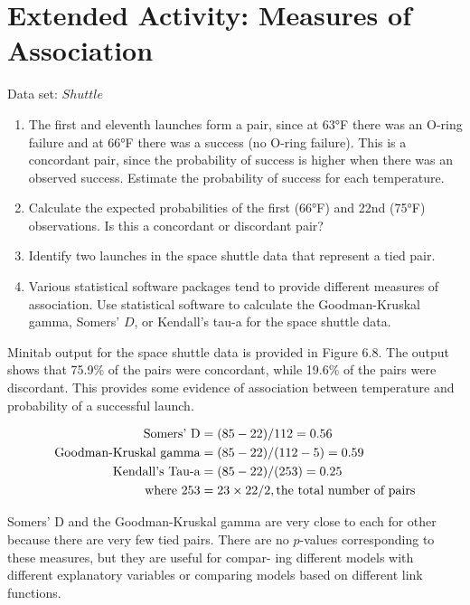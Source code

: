 \documentclass[
]{report}
\providecommand{\tightlist}{%
  \setlength{\itemsep}{0pt}\setlength{\parskip}{0pt}}
\begin{document}
\hypertarget{extended-activity-measures-of-association}{%
\section*{Extended Activity: Measures of Association}\label{extended-activity-measures-of-association}}

Data set: \(Shuttle\)

\begin{enumerate}
\def\labelenumi{\arabic{enumi}.}
\setcounter{enumi}{18}
\tightlist
\item
  The first and eleventh launches form a pair, since at 63°F there was an O-ring failure and at 66°F there was a success (no O-ring failure). This is a concordant pair, since the probability of success is higher when there was an observed success. Estimate the probability of success for each temperature.
\item
  Calculate the expected probabilities of the first (66°F) and 22nd (75°F) observations. Is this a concordant or discordant pair?
\item
  Identify two launches in the space shuttle data that represent a tied pair.
\item
  Various statistical software packages tend to provide different measures of association. Use statistical software to calculate the Goodman-Kruskal gamma, Somers' \(D\), or Kendall's tau-a for the space shuttle data.
\end{enumerate}

Minitab output for the space shuttle data is provided in Figure 6.8. The output shows that 75.9\% of the pairs
were concordant, while 19.6\% of the pairs were discordant. This provides some evidence of association
between temperature and probability of a successful launch.

\begin{align}
\text{Somers’ D} &= (85 - 22)/112 = 0.56 \notag \\
\text{Goodman-Kruskal gamma} &= (85 - 22)/(112 - 5) = 0.59 \notag \\
\text{Kendall’s Tau-a} &= (85 - 22)/(253) = 0.25 \notag \\
\text{where } 253 &= 23 \times 22/2, \text{the total number of pairs} \notag
\end{align}

Somers' D and the Goodman-Kruskal gamma are very close to each for other because there are very
few tied pairs. There are no \(p\)-values corresponding to these measures, but they are useful for compar-
ing different models with different explanatory variables or comparing models based on different link
functions.
\end{document}
